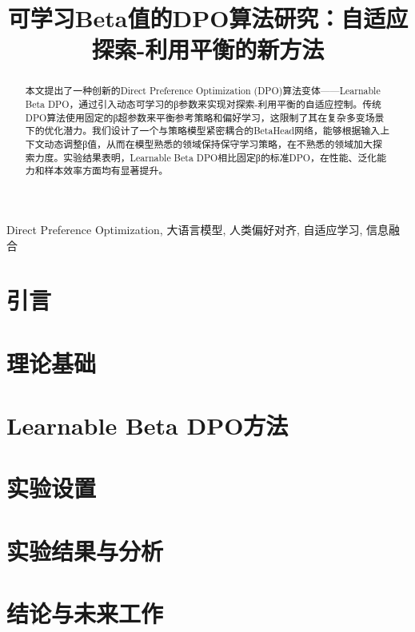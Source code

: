 \documentclass[conference]{IEEEtran}
\begin{document}
\begin{CJK}{UTF8}{gbsn}

\title{可学习Beta值的DPO算法研究：自适应探索-利用平衡的新方法}

\author{
}

\maketitle

\begin{abstract}
本文提出了一种创新的Direct Preference Optimization (DPO)算法变体——Learnable Beta DPO，通过引入动态可学习的β参数来实现对探索-利用平衡的自适应控制。传统DPO算法使用固定的β超参数来平衡参考策略和偏好学习，这限制了其在复杂多变场景下的优化潜力。我们设计了一个与策略模型紧密耦合的BetaHead网络，能够根据输入上下文动态调整β值，从而在模型熟悉的领域保持保守学习策略，在不熟悉的领域加大探索力度。实验结果表明，Learnable Beta DPO相比固定β的标准DPO，在性能、泛化能力和样本效率方面均有显著提升。
\end{abstract}

\begin{IEEEkeywords}
Direct Preference Optimization, 大语言模型, 人类偏好对齐, 自适应学习, 信息融合
\end{IEEEkeywords}

\section{引言}


\section{理论基础}


\section{Learnable Beta DPO方法}


\section{实验设置}


\section{实验结果与分析}


\section{结论与未来工作}





\end{CJK}
\end{document}
